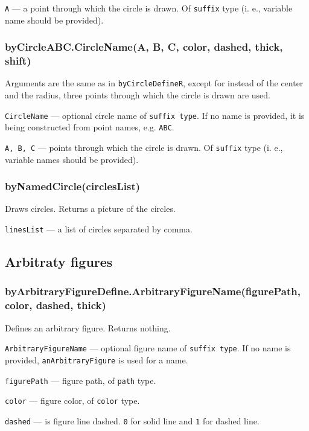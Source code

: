 \documentclass{ltxdoc}
\begin{document}
\texttt{A} — a point through which the circle is drawn. Of \texttt{suffix} type (i. e., variable name should be provided).

\subsubsection{byCircleABC.CircleName(A, B, C, color, dashed, thick, shift)}

Arguments are the same as in \texttt{byCircleDefineR}, except for instead of the center and the radius, three points through which the circle is drawn are used.

\texttt{CircleName} — optional circle name of \texttt{suffix type}. If no name is provided, it is being constructed from point names, e.g. \texttt{ABC}.

\texttt{A, B, C} — points through which the circle is drawn. Of \texttt{suffix} type (i. e., variable names should be provided).


\subsubsection{byNamedCircle(circlesList)}

Draws circles. Returns a picture of the circles.

\texttt{linesList} — a list of circles separated by comma.

\subsection{Arbitraty figures}

\subsubsection{byArbitraryFigureDefine.ArbitraryFigureName(figurePath, color, dashed, thick)}

Defines an arbitrary figure. Returns nothing.

\texttt{ArbitraryFigureName} — optional figure name of \texttt{suffix type}. If no name is provided, \texttt{anArbitraryFigure} is used for a name.

\texttt{figurePath} — figure path, of \texttt{path} type.

\texttt{color} — figure color, of \texttt{color} type.

\texttt{dashed} — is figure line dashed. \texttt{0} for solid line and \texttt{1} for dashed line.
\end{document}
